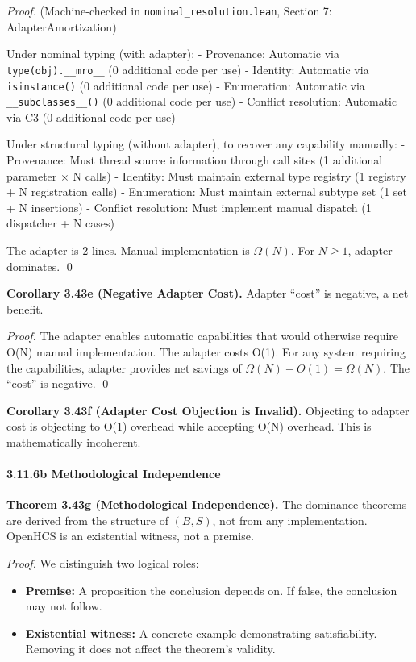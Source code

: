 \emph{Proof.} (Machine-checked in \texttt{nominal\_resolution.lean},
Section 7: AdapterAmortization)

Under nominal typing (with adapter): - Provenance: Automatic via
\texttt{type(obj).\_\_mro\_\_} (0 additional code per use) - Identity:
Automatic via \texttt{isinstance()} (0 additional code per use) -
Enumeration: Automatic via \texttt{\_\_subclasses\_\_()} (0 additional
code per use) - Conflict resolution: Automatic via C3 (0 additional code
per use)

Under structural typing (without adapter), to recover any capability
manually: - Provenance: Must thread source information through call
sites (1 additional parameter $\times$ N calls) - Identity: Must maintain
external type registry (1 registry + N registration calls) -
Enumeration: Must maintain external subtype set (1 set + N insertions) -
Conflict resolution: Must implement manual dispatch (1 dispatcher + N
cases)

The adapter is 2 lines. Manual implementation is \(\Omega(N)\). For
\(N \geq 1\), adapter dominates. \qed

\textbf{Corollary 3.43e (Negative Adapter Cost).} Adapter ``cost'' is
negative, a net benefit.

\emph{Proof.} The adapter enables automatic capabilities that would
otherwise require O(N) manual implementation. The adapter costs O(1).
For any system requiring the capabilities, adapter provides net savings
of \(\Omega(N) - O(1) = \Omega(N)\). The ``cost'' is negative.
\qed

\textbf{Corollary 3.43f (Adapter Cost Objection is Invalid).} Objecting
to adapter cost is objecting to O(1) overhead while accepting O(N)
overhead. This is mathematically incoherent.

\paragraph{3.11.6b Methodological
Independence}\label{b-methodological-independence}

\textbf{Theorem 3.43g (Methodological Independence).}\label{thm:methodological-independence}
The dominance
theorems are derived from the structure of \((B, S)\), not from any
implementation. OpenHCS is an existential witness, not a premise.

\emph{Proof.} We distinguish two logical roles:
\begin{itemize}
\tightlist
\item \textbf{Premise:} A proposition the conclusion depends on. If false,
  the conclusion may not follow.
\item \textbf{Existential witness:} A concrete example demonstrating
  satisfiability. Removing it does not affect the theorem's validity.
\end{itemize}

